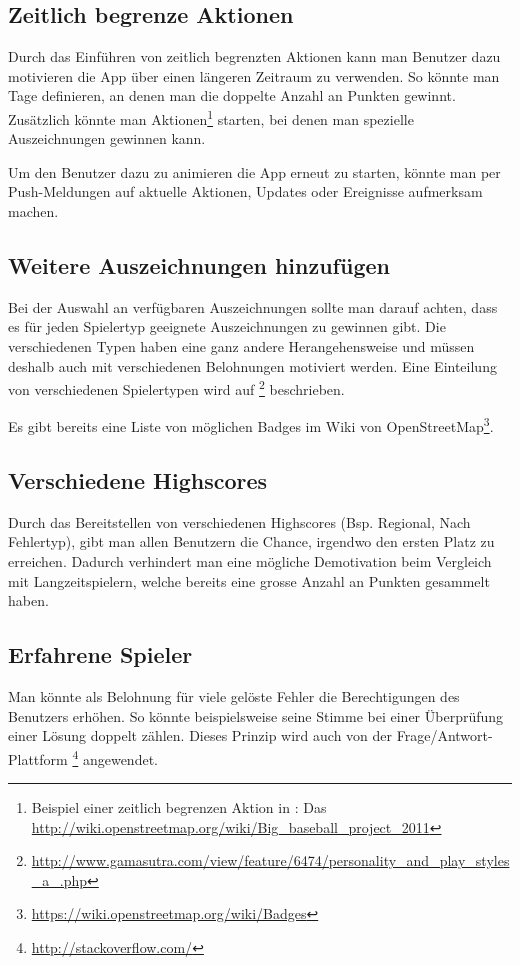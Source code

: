 \subsection{Zeitlich begrenze Aktionen}
Durch das Einführen von zeitlich begrenzten Aktionen kann man Benutzer dazu motivieren die App über einen längeren Zeitraum zu verwenden.
So könnte man Tage definieren, an denen man die doppelte Anzahl an Punkten gewinnt.
Zusätzlich könnte man Aktionen\footnote{Beispiel einer zeitlich begrenzen Aktion in : Das  \url{http://wiki.openstreetmap.org/wiki/Big_baseball_project_2011}} starten, bei denen man spezielle Auszeichnungen gewinnen kann.

Um den Benutzer dazu zu animieren die App erneut zu starten, könnte man per Push-Meldungen auf aktuelle Aktionen, Updates oder Ereignisse aufmerksam machen.

\subsection{Weitere Auszeichnungen hinzufügen}
Bei der Auswahl an verfügbaren Auszeichnungen sollte man darauf achten, dass es für jeden Spielertyp geeignete Auszeichnungen zu gewinnen gibt.
Die verschiedenen Typen haben eine ganz andere Herangehensweise und müssen deshalb auch mit verschiedenen Belohnungen motiviert werden.
Eine Einteilung von verschiedenen Spielertypen wird auf \footnote{\url{http://www.gamasutra.com/view/feature/6474/personality_and_play_styles_a_.php}} beschrieben.

Es gibt bereits eine Liste von möglichen Badges im Wiki von OpenStreetMap\footnote{\url{https://wiki.openstreetmap.org/wiki/Badges}}.

\subsection{Verschiedene Highscores}
Durch das Bereitstellen von verschiedenen Highscores (Bsp. Regional, Nach Fehlertyp), gibt man allen Benutzern die Chance, irgendwo den ersten Platz zu erreichen.
Dadurch verhindert man eine mögliche Demotivation beim Vergleich mit Langzeitspielern, welche bereits eine grosse Anzahl an Punkten gesammelt haben.

\subsection{Erfahrene Spieler}
Man könnte als Belohnung für viele gelöste Fehler die Berechtigungen des Benutzers erhöhen.
So könnte beispielsweise seine Stimme bei einer Überprüfung einer Lösung doppelt zählen.
Dieses Prinzip wird auch von der Frage/Antwort-Plattform \footnote{\url{http://stackoverflow.com/}} angewendet.

